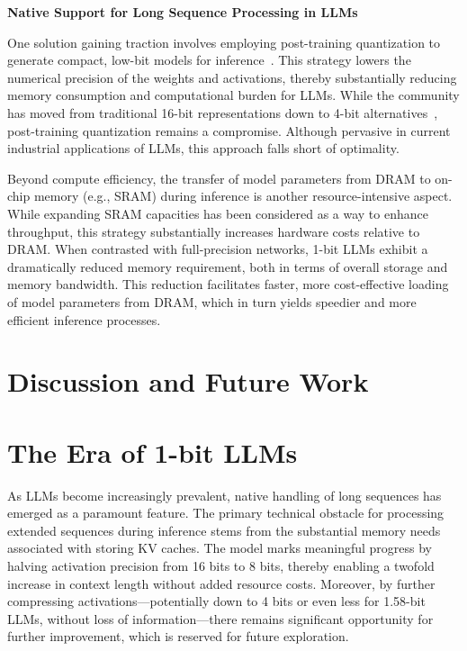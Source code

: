 \textbf{Native Support for Long Sequence Processing in LLMs}

One solution gaining traction involves employing post-training quantization to generate compact, low-bit models for inference~\cite{smoothquant, gptq, quip, quip_sharp}. This strategy lowers the numerical precision of the weights and activations, thereby substantially reducing memory consumption and computational burden for LLMs. While the community has moved from traditional 16-bit representations down to 4-bit alternatives~\cite{gptq, awq}, post-training quantization remains a compromise. Although pervasive in current industrial applications of LLMs, this approach falls short of optimality.

Beyond compute efficiency, the transfer of model parameters from DRAM to on-chip memory (e.g., SRAM) during inference is another resource-intensive aspect. While expanding SRAM capacities has been considered as a way to enhance throughput, this strategy substantially increases hardware costs relative to DRAM. When contrasted with full-precision networks, 1-bit LLMs exhibit a dramatically reduced memory requirement, both in terms of overall storage and memory bandwidth. This reduction facilitates faster, more cost-effective loading of model parameters from DRAM, which in turn yields speedier and more efficient inference processes.

\section{Discussion and Future Work}

\section{The Era of 1-bit LLMs}

As LLMs become increasingly prevalent, native handling of long sequences has emerged as a paramount feature. The primary technical obstacle for processing extended sequences during inference stems from the substantial memory needs associated with storing KV caches. The  model marks meaningful progress by halving activation precision from 16 bits to 8 bits, thereby enabling a twofold increase in context length without added resource costs. Moreover, by further compressing activations—potentially down to 4 bits or even less for 1.58-bit LLMs, without loss of information—there remains significant opportunity for further improvement, which is reserved for future exploration.

